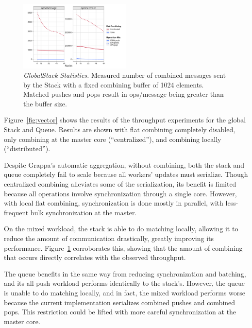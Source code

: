 \begin{figure}[t]
  \centering
  \includegraphics[width=0.5\textwidth]{data/plots/stack_stats.pdf}
  \caption{\emph{GlobalStack Statistics.}
    Measured number of combined messages sent by the Stack with a fixed combining buffer of 1024 elements.
    Matched pushes and pops result in ops/message being greater than the buffer size.
  }
  \label{fig:stack_stats}
\end{figure}

Figure~\ref{fig:vector} shows the results of the throughput experiments for the global Stack and Queue. Results are shown with flat combining completely disabled, only combining at the master core (``centralized''), and combining locally (``distributed'').

Despite Grappa's automatic aggregation, without combining, both the stack and queue completely fail to scale because all workers' updates must serialize.
Though centralized combining alleviates some of the serialization, its benefit is limited 
because all operations involve synchronization through a single core.
However, with local flat combining, synchronization is done mostly in parallel, with less-frequent bulk synchronization at the master.

On the mixed workload, the stack is able to do matching locally, allowing it to reduce the amount of communication drastically, greatly improving its performance. Figure~\ref{fig:stack_stats} corroborates this, showing that the amount of combining that occurs directly correlates with the observed throughput.


The queue benefits in the same way from reducing synchronization and batching, and its all-push workload performs identically to the stack's.
However, the queue is unable to do matching locally, and in fact, the mixed workload performs worse because the current implementation serializes combined pushes and combined pops. This restriction could be lifted with more careful synchronization at the master core.

